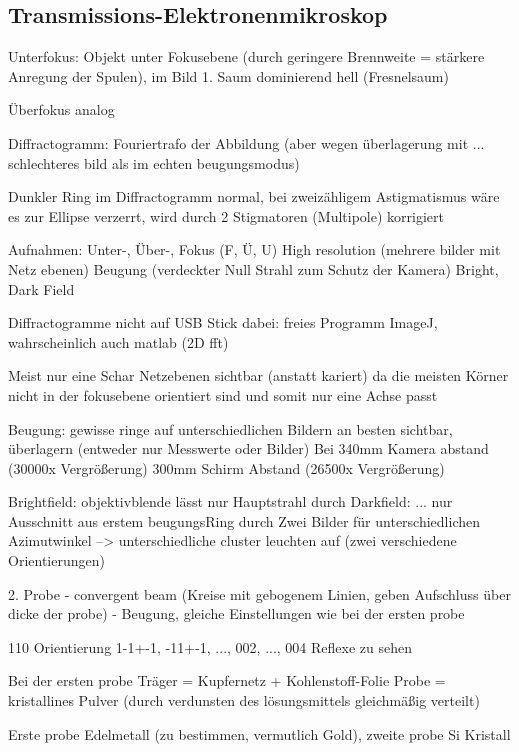 \newpage
\subsection{Transmissions-Elektronenmikroskop}

Unterfokus: Objekt unter Fokusebene (durch geringere Brennweite = stärkere Anregung der Spulen), im Bild 1. Saum dominierend hell (Fresnelsaum)

Überfokus analog

Diffractogramm: Fouriertrafo der Abbildung (aber wegen überlagerung mit ... schlechteres bild als im echten beugungsmodus)

Dunkler Ring im Diffractogramm normal, bei zweizähligem Astigmatismus wäre es zur Ellipse verzerrt, wird durch 2 Stigmatoren (Multipole) korrigiert


Aufnahmen:
Unter-, Über-, Fokus (F, Ü, U)
High resolution (mehrere bilder mit Netz ebenen)
Beugung (verdeckter Null Strahl zum Schutz der Kamera)
Bright, Dark Field

Diffractogramme nicht auf USB Stick dabei: freies Programm ImageJ, wahrscheinlich auch matlab (2D fft)

Meist nur eine Schar Netzebenen sichtbar (anstatt kariert) da die meisten Körner nicht in der fokusebene orientiert sind und somit nur eine Achse passt


Beugung: gewisse ringe auf unterschiedlichen Bildern an besten sichtbar, überlagern (entweder nur Messwerte oder Bilder)
Bei 340mm Kamera abstand (30000x Vergrößerung)
300mm Schirm Abstand (26500x Vergrößerung)

Brightfield: objektivblende lässt nur Hauptstrahl durch
Darkfield: ... nur Ausschnitt aus erstem beugungsRing durch
Zwei Bilder für unterschiedlichen Azimutwinkel --> unterschiedliche cluster leuchten auf (zwei verschiedene Orientierungen)




2. Probe
- convergent beam (Kreise mit gebogenem Linien, geben Aufschluss über dicke der probe)
- Beugung, gleiche Einstellungen wie bei der ersten probe

110 Orientierung
1-1+-1, -11+-1, ..., 002, ..., 004 Reflexe zu sehen



Bei der ersten probe
Träger = Kupfernetz + Kohlenstoff-Folie
Probe = kristallines Pulver (durch verdunsten des lösungsmittels gleichmäßig verteilt)

Erste probe Edelmetall (zu bestimmen, vermutlich Gold), zweite probe Si Kristall



